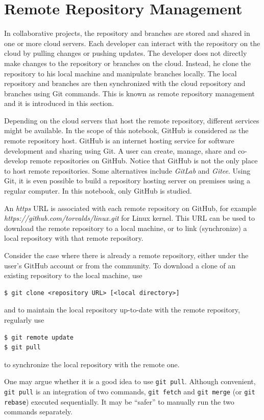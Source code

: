 \section{Remote Repository Management} \label{ch:sma:sec:rrm}

In collaborative projects, the repository and branches are stored and shared in one or more cloud servers. Each developer can interact with the repository on the cloud by pulling changes or pushing updates. The developer does not directly make changes to the repository or branches on the cloud. Instead, he clone the repository to his local machine and manipulate branches locally. The local repository and branches are then synchronized with the cloud repository and branches using Git commands. This is known as remote repository management and it is introduced in this section.

Depending on the cloud servers that host the remote repository, different services might be available. In the scope of this notebook, GitHub is considered as the remote repository host. GitHub is an internet hosting service for software development and sharing using Git. A user can create, manage, share and co-develop remote repositories on GitHub. Notice that GitHub is not the only place to host remote repositories. Some alternatives include \textit{GitLab} and \textit{Gitee}. Using Git, it is even possible to build a repository hosting server on premises using a regular computer. In this notebook, only GitHub is studied.

An \textit{https} URL is associated with each remote repository on GitHub, for example \textit{https://github.com/torvalds/linux.git} for Linux kernel. This URL can be used to download the remote repository to a local machine, or to link (synchronize) a local repository with that remote repository.

Consider the case where there is already a remote repository, either under the user's GitHub account or from the community. To download a clone of an existing repository to the local machine, use
\begin{lstlisting}
$ git clone <repository URL> [<local directory>]
\end{lstlisting}
and to maintain the local repository up-to-date with the remote repository, regularly use
\begin{lstlisting}
$ git remote update
$ git pull
\end{lstlisting}
to synchronize the local repository with the remote one.

\begin{shortbox}

One may argue whether it is a good idea to use \verb|git pull|. Although convenient, \verb|git pull| is an integration of two commands, \verb|git fetch| and \verb|git merge| (or \verb|git rebase|) executed sequentially. It may be ``safer'' to manually run the two commands separately.
\end{shortbox}

